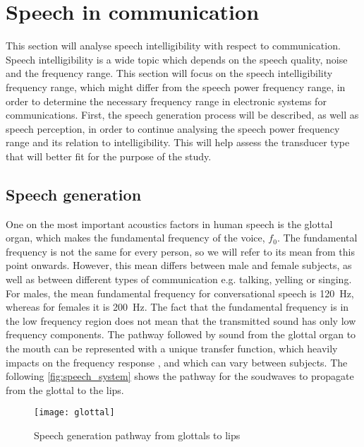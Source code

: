 \section{Speech in communication}
\label{speech_in_comm}

This section will analyse speech intelligibility with respect to communication. Speech intelligibility is a wide topic which depends on the speech quality, noise and the frequency range. This section will focus on the speech intelligibility frequency range, which might differ from the speech power frequency range, in order to determine the necessary frequency range in electronic systems for communications. First, the speech generation process will be described, as well as speech perception, in order to continue analysing the speech power frequency range and its relation to intelligibility. This will help assess the transducer type that will better fit for the purpose of the study.

\subsection{Speech generation}

One on the most important acoustics factors in human speech is the glottal organ, which makes the fundamental frequency of the voice, $f_0$. The fundamental frequency is not the same for every person, so we will refer to its mean from this point onwards. However, this mean differs between male and female subjects, as well as between different types of communication e.g. talking, yelling or singing. For males, the mean fundamental frequency for conversational speech is \SI{120}{\hertz}, whereas for females it is \SI{200}{\hertz}. The fact that the fundamental frequency is in the low frequency region does not mean that the transmitted sound has only low frequency components. The pathway followed by sound from the glottal organ to the mouth can be represented with a unique transfer function, which heavily impacts on the frequency response \citep{pulkki2015}, and which can vary between subjects. The following \autoref{fig:speech_system} shows the pathway for the soudwaves to propagate from the glottal to the lips.

 \begin{figure}[H]
	\centering
		\texttt{[image: glottal]}
		\caption{Speech generation pathway from glottals to lips \citep{pulkki2015}}
		\label{fig:speech_system}
\end{figure}

